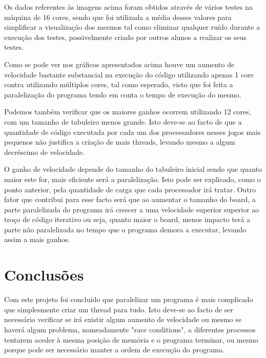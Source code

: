 \documentclass[a4paper]{article}
\begin{document}
Os dados referentes às imagens acima foram obtidos através de vários testes na máquina de 16 cores, sendo que foi utilizada a média desses valores para simplificar a visualização dos mesmos tal como eliminar qualquer ruído durante a execução dos testes, possivelmente criado por outros alunos a realizar os seus testes.

Como se pode ver nos gráficos apresentados acima houve um aumento de velocidade bastante substancial na execução do código utilizando apenas 1 core contra utilizando múltiplos cores, tal como esperado, visto que foi feita a paralelização do programa tendo em conta o tempo de execução do mesmo.


Podemos também verificar que os maiores ganhos ocorrem utilizando 12 cores, com um tamanho de tabuleiro menos grande. Isto deve-se ao facto de que a quantidade de código executada por cada um dos processadores nesses jogos mais pequenos não justifica a criação de mais threads, levando mesmo a algum decréscimo de velocidade. 

O ganho de velocidade depende do tamanho do tabuleiro inicial sendo que quanto maior este for, mais eficiente será a paralelização. Isto pode ser explicado, como o ponto anterior, pela quantidade de carga que cada processador irá tratar. Outro fator que contribui para esse facto será que ao aumentar o tamanho do board, a parte paralelizada do programa irá crescer a uma velocidade superior superior ao troço de código iterativo ou seja, quanto maior o board, menos impacto terá a parte não paralelizada no tempo que o programa demora a executar, levando assim a mais ganhos.

\section{Conclusões}
Com este projeto foi concluido que paralelizar um programa é mais complicado que simplesmente criar um thread para tudo. Isto deve-se ao facto de ser necessário verificar se irá existir algum aumento de velocidade ou mesmo se haverá algum problema, nomeadamente "race conditions", a diferentes processos tentarem aceder à mesma posição de memória e o programa terminar, ou mesmo porque pode ser necessário manter a ordem de execução do programa. 
\end{document}
